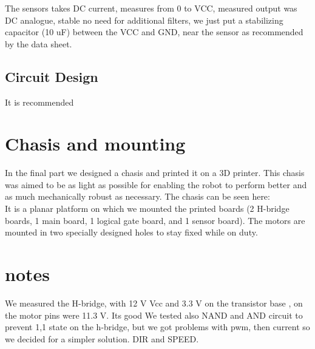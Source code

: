 The sensors takes DC current, measures from 0 to VCC, measured output was DC analogue, stable no need for additional filters, we just put a stabilizing capacitor (10 uF) between the VCC and GND, near the sensor as recommended by the data sheet.
\section{Circuit Design}
It is recommended 

\chapter{Chasis and mounting}
\label{chap:Chassis}

In the final part we designed a chasis and printed it on a 3D printer. This chasis
was aimed to be as light as possible for enabling the robot to perform better and as much mechanically robust as necessary. The chasis can be seen here:
\\It is a planar platform on which we mounted the printed boards (2 H-bridge boards, 1 main board, 1 logical gate board, and 1 sensor board). The motors are mounted in two specially designed holes to stay fixed while on duty. 

\chapter{notes}
We measured the H-bridge, with 12 V Vcc and 3.3 V on the transistor base , on the motor pins were 11.3 V. Its good
We tested also NAND and AND circuit to prevent 1,1 state on the h-bridge, but we got problems with pwm, then current so we decided for a simpler solution. DIR and SPEED.